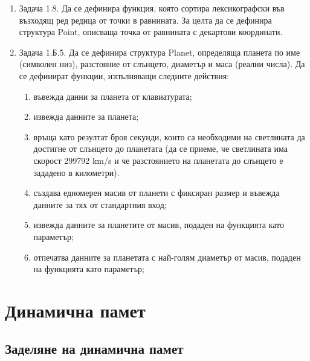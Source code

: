 {\begin{enumerate}
	В главната функция да се дава възможност за избор на режим на въвеждане: r – за въвеждане в правоъгълни и p – в полярни координати. За всеки избран режим да се въведат произволен брой вектори, да се преобразуват в другия режим и да се изведат.

	\item Задача 1.8.\cite{sbornik2} \label{zad:structpoint}Да се дефинира функция, която сортира лексикографски във възходящ ред редица от точки в равнината. За целта да се дефинира структура Point, описваща точка от равнината с декартови координати.

	\item Задача 1.Б.5.\cite{sbornik2} Да се дефинира структура Planet, определяща планета по име (символен низ), разстояние от слънцето, диаметър и маса (реални числа). Да се дефинират функции, изпълняващи следните действия:

	\begin{enumerate}[label=\alph*)]%
		\item въвежда данни за планета от клавиатурата;
		\item извежда данните за планета;
		\item  връща като резултат броя секунди, които са необходими на светлината да достигне от слънцето до планетата (да се приеме, че светлината има скорост 299792 km/s и че разстоянието на планетата до слънцето е зададено в километри).
		\item създава едномерен масив от планети с фиксиран размер и въвежда данните за тях от стандартния вход;
		\item извежда данните за планетите от масив, подаден на функцията като параметър;
		\item отпечатва данните за планетата с най-голям диаметър от масив, подаден на функцията като параметър;
	\end{enumerate}


\end{enumerate}

\pagebreak

\clearpage\section {Динамична памет}

\subsection {Заделяне на динамична памет}

}
